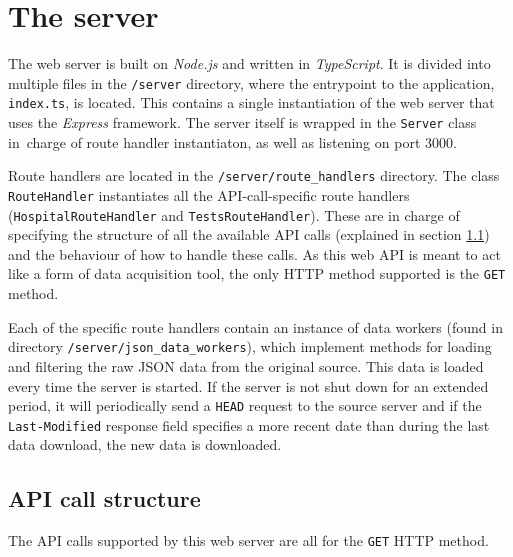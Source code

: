 \documentclass[pdftex, 11pt, a4paper]{article}
\newcommand{\code}{\texttt}
\begin{document}
    \section{The server}
    The web server is built on \emph{Node.js} and written in \emph{TypeScript}.
    It is divided into multiple files in the \code{/server} directory, where
    the entrypoint to the application, \code{index.ts}, is located. This contains
    a single instantiation of the web server that uses the \emph{Express} framework.
    The server itself is wrapped in the \code{Server} class in~charge of route handler
    instantiaton, as well as listening on port 3000.

    Route handlers are located in the \code{/server/route\_handlers} directory.
    The class \code{RouteHandler} instantiates all the API-call-specific route handlers
    (\code{HospitalRouteHandler} and \code{TestsRouteHandler}). These are in charge of
    specifying the structure of all the available API calls (explained in section
    \ref{sec:api_structure}) and the behaviour of how to handle these calls. As this web
    API is meant to act like a form of data acquisition tool, the only HTTP method
    supported is the \code{GET} method.

    Each of the specific route handlers contain an instance of data workers
    (found in directory \newline \code{/server/json\_data\_workers}), which implement methods for
    loading and filtering the raw JSON data from the original source. This data is loaded
    every time the server is started. If the server is not shut down for an extended period,
    it will periodically send a \code{HEAD} request to the source server and if the
    \code{Last-Modified} response field specifies a more recent date than during
    the last data download, the new data is downloaded.

    \subsection{API call structure} \label{sec:api_structure}
    The API calls supported by this web server are all for the \code{GET} HTTP method.
\end{document}
